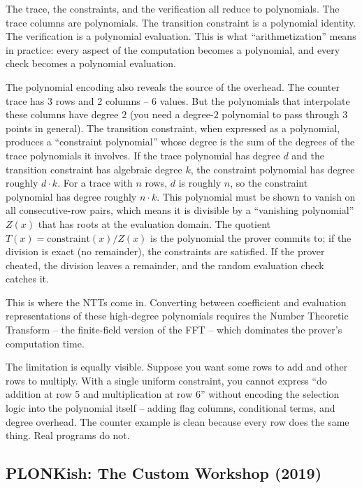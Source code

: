 \documentclass[
  11pt,
  openany]{report}
\begin{document}
The trace, the constraints, and the verification all reduce to polynomials. The
trace columns are polynomials. The transition constraint is a polynomial
identity. The verification is a polynomial evaluation. This is what
``arithmetization'' means in practice: every aspect of the computation becomes a
polynomial, and every check becomes a polynomial evaluation.

The polynomial encoding also reveals the source of the overhead. The counter
trace has 3 rows and 2 columns -- 6 values. But the polynomials that interpolate
these columns have degree \(2\) (you need a degree-\(2\) polynomial to pass
through 3 points in general). The transition constraint, when expressed as a
polynomial, produces a ``constraint polynomial'' whose degree is the sum of the
degrees of the trace polynomials it involves. If the trace polynomial has degree
\(d\) and the transition constraint has algebraic degree \(k\), the constraint
polynomial has degree roughly \(d \cdot k\). For a trace with \(n\) rows, \(d\)
is roughly \(n\), so the constraint polynomial has degree roughly \(n \cdot k\).
This polynomial must be shown to vanish on all consecutive-row pairs, which
means it is divisible by a ``vanishing polynomial'' \(Z(x)\) that has roots at
the evaluation domain. The quotient \(T(x) = \text{constraint}(x) / Z(x)\) is
the polynomial the prover commits to; if the division is exact (no remainder),
the constraints are satisfied. If the prover cheated, the division leaves a
remainder, and the random evaluation check catches it.

This is where the NTTs come in. Converting between coefficient and evaluation
representations of these high-degree polynomials requires the Number Theoretic
Transform -- the finite-field version of the FFT -- which dominates the prover's
computation time.

The limitation is equally visible. Suppose you want some rows to add and other
rows to multiply. With a single uniform constraint, you cannot express ``do
addition at row 5 and multiplication at row 6'' without encoding the selection
logic into the polynomial itself -- adding flag columns, conditional terms, and
degree overhead. The counter example is clean because every row does the same
thing. Real programs do not.

\subsection{PLONKish: The Custom Workshop
(2019)}\label{plonkish-the-custom-workshop-2019}
\end{document}
